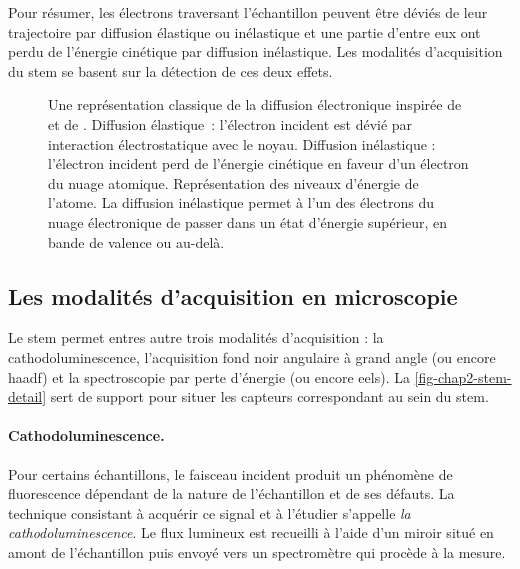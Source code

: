    Pour résumer, les électrons traversant l'échantillon peuvent être déviés de leur trajectoire par diffusion élastique ou inélastique et une partie d'entre eux ont perdu de l'énergie cinétique par diffusion inélastique. Les modalités d'acquisition du \gls{stem} se basent sur la détection de ces deux effets.

    \begin{figure}
    	\centering
    	
        \vspace{1em}
    	\caption{Une représentation classique de la diffusion électronique inspirée de~\cite{egerton2011electron} et de \cite{colliex1998microscopie}.
         Diffusion élastique : l'électron incident est dévié par interaction électrostatique avec le noyau. 
         Diffusion inélastique : l'électron incident perd de l'énergie cinétique en faveur d'un électron du nuage atomique.
         Représentation des niveaux d'énergie de l'atome. La diffusion inélastique permet à l'un des électrons du nuage électronique de passer dans un état d'énergie supérieur, en bande de valence ou au-delà.  %
            \protect\label{fig-chap2-interactions}}
    \end{figure}


    \subsection{Les modalités d'acquisition en microscopie }\label{subsec-modalitees-stem}

    Le \gls{stem} permet entres autre trois modalités d'acquisition : la cathodoluminescence, l'acquisition fond noir angulaire à grand angle (ou encore \gls{haadf}) et la spectroscopie par perte d'énergie (ou encore \gls{eels}). La \cref{fig-chap2-stem-detail} sert de support pour situer les capteurs correspondant au sein du \gls{stem}.

    \paragraph*{Cathodoluminescence.} Pour certains échantillons, le faisceau incident produit un phénomène de fluorescence dépendant de la nature de l'échantillon et de ses défauts. La technique consistant à acquérir ce signal et à l'étudier s'appelle \emph{la cathodoluminescence}. Le flux lumineux est recueilli à l'aide d'un miroir situé en amont de l'échantillon puis envoyé vers un spectromètre qui procède à la mesure.

